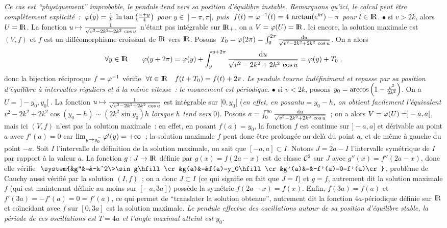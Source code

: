 \documentclass{article}
\begin{document}
{\it Ce cas est ``physiquement'' improbable, le pendule tend vers sa position d'\'equilibre instable.\ssk\new
Remarquons qu'ici, le calcul peut \^etre compl\`etement explicit\'e~: $\;\varphi(y)={1\over k}\>\ln\tan\left({\pi+y\over4}\right)$ pour $y\in\>]-\pi,\pi[$, puis $\;f(t)=\varphi^{-1}(t)=4\>\arctan(e^{kt})-\pi$ pour $t\in{\rm I\kern-0.6mm R}$.}
\msk
$\bullet$ si $v>2k$, alors $U={\rm I\kern-0.6mm R}$. La fonction $u\mapsto{1\over\sqrt{v^2-2k^2+2k^2\>\cos u}}$ n'\'etant pas int\'egrable sur ${\rm I\kern-0.6mm R}_+$, on a $V=\varphi(U)={\rm I\kern-0.6mm R}$. Ici encore, la solution maximale est $(V,f)$ et $f$ est un diff\'eomorphisme croissant de ${\rm I\kern-0.6mm R}$ vers ${\rm I\kern-0.6mm R}$.
Posons $\;T_0=\varphi(2\pi)=\int_0^{2\pi}{{\rm d}u\over\sqrt{v^2-2k^2+2k^2\>\cos u}}$. On a alors
$$\forall y\in{\rm I\kern-0.6mm R}\qquad\varphi(y+2\pi)=\varphi(y)+\int_y^{y+2\pi}{{\rm d}u\over\sqrt{v^2-2k^2+2k^2\>\cos u}}=\varphi(y)+T_0\;,$$
donc la bijection r\'eciproque $f=\varphi^{-1}$ v\'erifie $\;\forall t\in{\rm I\kern-0.6mm R}\quad f(t+T_0)=f(t)+2\pi$.\ssk\sect
{\it Le pendule tourne ind\'efiniment et repasse par sa position d'\'equilibre \`a intervalles r\'eguliers et \`a la m\^eme vitesse~: le mouvement est p\'eriodique}.
\msk
$\bullet$ si $v<2k$, posons $y_0=\arccos\left(1-{v^2\over2k^2}\right)$. On a $U=\>]-y_0,y_0[\>$.\ssk\new
La fonction $u\mapsto{1\over\sqrt{v^2-2k^2+2k^2\>\cos u}}$ est int\'egrable sur $[0,y_0[$ ({\it en effet, en posant\break $u=y_0-h$, on obtient facilement l'\'equivalent $v^2-2k^2+2k^2\cos(y_0-h)\sim(2k^2\sin y_0)h$ lorsque $h$ tend vers} 0). Posons $a=\int_0^{y_0}{{\rm d}u\over\sqrt{v^2-2k^2+2k^2\>\cos u}}$~; on a alors $V=\varphi(U)=]-a,a[$, mais ici $(V,f)$ n'est pas la solution maximale~: en effet, en posant $f(a)=y_0$, la fonction $f$ est continue sur $]-a,a]$ et d\'erivable au point $a$ avec $f'(a)=0$ car $\lim_{y\rightarrow y_0^-}\varphi'(y)=+\infty$~; la solution maximale $f$ peut donc \^etre prolong\'ee au-del\`a du point $a$, et de m\^eme \`a gauche du point $-a$.\ssk\sect
Soit $I$ l'intervalle de d\'efinition de la solution maximale, on sait que $[-a,a]\subset I$. Notons $J=2a-I$ l'intervalle sym\'etrique de $I$ par rapport \`a la valeur $a$. La fonction $g:J\rightarrow{\rm I\kern-0.6mm R}$ d\'efinie par $g(x)=f(2a-x)$ est de classe ${\cal C}^2$ sur $J$ avec $g''(x)=f''(2a-x)$, donc elle v\'erifie $\;\system{&g''&=&-k^2\>\sin g\hfill\cr &g(a)&=&f(a)=y_0\hfill\cr &g'(a)&=&-f'(a)=0=f'(a)\cr}$, probl\`eme de Cauchy aussi v\'erifi\'e par la solution $(I,f)$~; on a donc $J\subset I$ (ce qui signifie en fait que $J=I$) et $g=f$, autrement dit la solution maximale $f$ (qui est maintenant d\'efinie au moins sur $[-a,3a]$) poss\`ede la sym\'etrie $f(2a-x)=f(x)$.\ssk\sect
Enfin, $f(3a)=f(a)$ et $f'(3a)=-f'(a)=0=f'(a)$, ce qui permet de ``translater la solution obtenue'', autrement dit la fonction $4a$-p\'eriodique d\'efinie sur ${\rm I\kern-0.6mm R}$ et co\"\i ncidant avec $f$ sur $[0,3a]$ est la solution maximale.\ssk\sect
{\it Le pendule effectue des oscillations autour de sa position d'\'equilibre stable, la p\'eriode de ces oscillations est $T=4a$ et l'angle maximal atteint est $y_0$}. 
\end{document}
